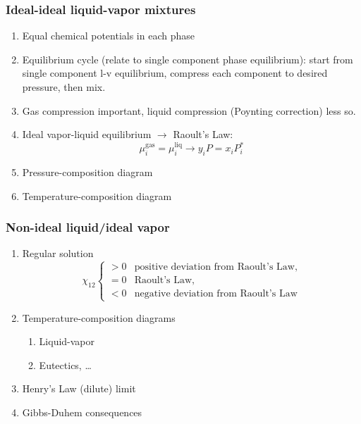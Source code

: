 \documentclass[11pt]{article}
\begin{document}
\subsubsection{Ideal-ideal liquid-vapor mixtures}
\label{sec:orgf0e8816}
\begin{enumerate}
\item Equal chemical potentials in each phase
\item Equilibrium cycle (relate to single component phase equilibrium): start from single component l-v equilibrium, compress each component to desired pressure, then mix.
\item Gas compression important, liquid compression (Poynting correction) less so.
\item Ideal vapor-liquid equilibrium \(\rightarrow\) Raoult's Law:
\begin{equation*}
  \mu_i^\text{gas} = \mu_i^\text{liq} \rightarrow y_i P = x_i P_i^*
\end{equation*}
\item Pressure-composition diagram
\item Temperature-composition diagram
\end{enumerate}

\subsubsection{Non-ideal liquid/ideal vapor}
\label{sec:org7f729c1}
\begin{enumerate}
\item Regular solution
   \begin{equation*}
  \chi_{12} \left \{
   \begin{array}{rl}
     > 0 & \text{positive deviation from Raoult's Law,}\\
     = 0 & \text{Raoult's Law,}\\
     <0 & \text{negative deviation from Raoult's Law}
    \end{array} \right .
\end{equation*}
\item Temperature-composition diagrams
\begin{enumerate}
\item Liquid-vapor
\item Eutectics, \ldots{}
\end{enumerate}
\item Henry's Law (dilute) limit
\item Gibbs-Duhem consequences
\end{enumerate}
\end{document}
